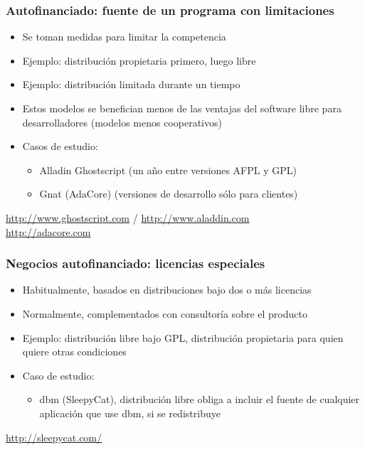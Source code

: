 
\begin{frame}
\frametitle{Autofinanciado: fuente de un programa con limitaciones}

\begin{itemize}
\item Se toman medidas para limitar la competencia
\item Ejemplo: distribución propietaria primero, luego libre
\item Ejemplo: distribución limitada durante un tiempo
\item Estos modelos se benefician menos de las ventajas del software
  libre para desarrolladores (modelos menos cooperativos)
\item Casos de estudio:
  \begin{itemize}
  \item Alladin Ghostscript (un año entre versiones AFPL y GPL) 
  \item Gnat (AdaCore) (versiones de desarrollo sólo para clientes)
  \end{itemize}
\end{itemize}

\begin{flushright}
\url{http://www.ghostscript.com} / \url{http://www.aladdin.com} \\
\url{http://adacore.com} 
\end{flushright}

\end{frame}


\begin{frame}
\frametitle{Negocios autofinanciado: licencias especiales}

\begin{itemize}
\item Habitualmente, basados en distribuciones bajo dos o más
  licencias
\item Normalmente, complementados con consultoría sobre el producto
\item Ejemplo: distribución libre bajo GPL, distribución propietaria
  para quien quiere otras condiciones
\item Caso de estudio:
  \begin{itemize}
    \item dbm (SleepyCat), distribución libre obliga a incluir el
      fuente de cualquier aplicación que use dbm, si se redistribuye
  \end{itemize}
\end{itemize}

\begin{flushright}
\url{http://sleepycat.com/} 
\end{flushright}

\end{frame}

